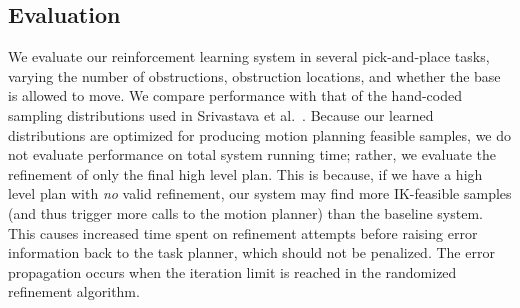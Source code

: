\begin{table}
  \centering
  \vspace{8pt}
  \caption{Percent solved, along with time spent motion planning and number of calls to the motion
planner for the final refinement. Results are averaged across 50 test environments per scenario, when both
the baseline and our system succeed. The test environments
were grouped into batches of 5, and each batch first received independent training with a distinct random seed. For each scenario,
we provide baseline system results using hand-tuned sampling distributions (B) and results from running
our reinforcement learning system (L).}
  \label{table:results}
\end{table}

\subsection{Evaluation}
We evaluate our reinforcement learning system in several pick-and-place
tasks, varying the number of obstructions, obstruction locations, and whether
the base is allowed to move. We compare performance with that of the
hand-coded sampling distributions used in Srivastava et al.~\cite{srivastava2014combined}.
Because our learned distributions are optimized for producing motion planning
feasible samples, we do not evaluate performance on total system
running time; rather, we evaluate the refinement of only the final high level
plan. This is because, if we have a high level plan with \emph{no} valid refinement,
our system may find more IK-feasible samples (and thus trigger more calls to
the motion planner) than the baseline system. This causes increased time spent
on refinement attempts before raising error information back to the task planner,
which should not be penalized. The error propagation occurs when the iteration
limit is reached in the randomized refinement algorithm.

